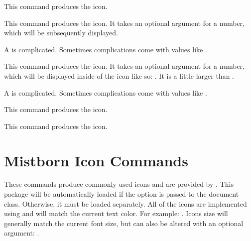 \documentclass[article,ariandor]{plotweaver}
\begin{document}
\begin{docCommand}[
    doc name        = forever,
    doc description = { \forever },
  ]{}{}
  This command produces the \forever icon.
\end{docCommand}

\begin{docCommand}[
    doc name        = complication,
    doc description = { \complication },
    doc updated     = 2026-08-11,
    doc parameter = \oarg{value},
  ]{}{}
  This command produces the \complication icon. It takes an optional argument for a number, which will be subsequently displayed.
  \begin{dispExample}
  A \complication is complicated. Sometimes complications come with values like \complication[X].
  \end{dispExample}
\end{docCommand}

\begin{docCommand}[
    doc name        = complicationDice,
    doc description = { \complicationDice[x] },
    doc parameter = \oarg{value},
    doc updated     = 2026-08-11,
  ]{}{}
  This command produces the \complicationDice icon. It takes an optional argument for a number, which will be displayed inside of the icon like so: \complicationDice[x]. It is a little larger than .
  \begin{dispExample}
  A \complicationDice is complicated. Sometimes complications come with values like \complicationDice[x].
  \end{dispExample}
\end{docCommand}

\begin{docCommand}[
    doc name        = opportunity,
    doc description = { \opportunity },
  ]{}{}
  This command produces the \opportunity icon.
\end{docCommand}

\begin{docCommand}[
    doc name        = key,
    doc description = { \key },
    doc updated     = 2026-08-11,
  ]{}{}
  This command produces the \key icon.
\end{docCommand}

\section{Mistborn Icon Commands}
These commands produce commonly used icons and are provided by . This package will be automatically loaded if the  option is passed to the document class. Otherwise, it must be loaded separately. All of the icons are implemented using  and will match the current text color. For example: \textcolor{red}{\alBronze} \textcolor{blue}{\alBronze} \textcolor{green}{\alBronze}. Icons size will generally match the current font size, but can also be altered with an optional argument: \feElectrum[0.5] \feElectrum[0.3] \feElectrum[0.1].
\end{document}
